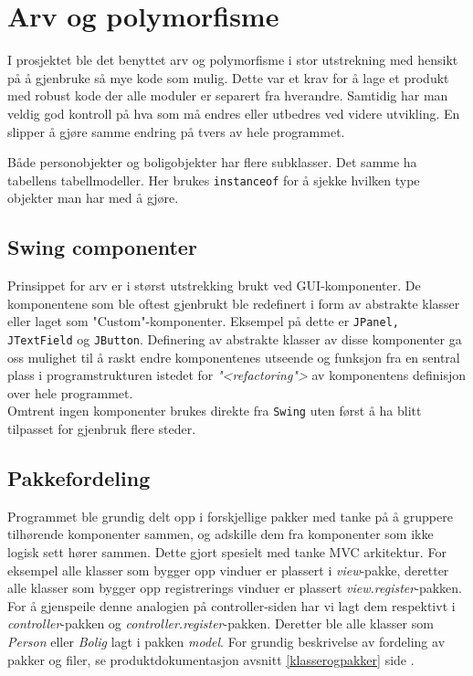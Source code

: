 \section{Arv og polymorfisme}
I prosjektet ble det benyttet arv og polymorfisme i stor utstrekning med hensikt på å gjenbruke så mye kode som mulig. Dette var et krav for å lage et produkt med robust kode der alle moduler er separert fra hverandre. Samtidig har man veldig god kontroll på hva som må endres eller utbedres ved videre utvikling. En slipper å gjøre samme endring på tvers av hele programmet.

Både personobjekter og boligobjekter har flere subklasser. Det samme ha tabellens tabellmodeller. Her brukes \texttt{instanceof} for å sjekke hvilken type objekter man har med å gjøre.

\subsection{Swing componenter}
Prinsippet for arv er i størst utstrekking brukt ved GUI-komponenter. De komponentene som ble oftest gjenbrukt ble redefinert i form av abstrakte klasser eller laget som "Custom"-komponenter. Eksempel på dette er \texttt{JPanel, JTextField} og \texttt{JButton}. Definering av abstrakte klasser av disse komponenter ga oss mulighet til å raskt endre komponentenes utseende og funksjon fra en sentral plass i programstrukturen istedet for \textit{"<refactoring">} av komponentens definisjon over hele programmet.\\  
Omtrent ingen komponenter brukes direkte fra \texttt{Swing} uten først å ha blitt tilpasset for gjenbruk flere steder.

\subsection{Pakkefordeling}
Programmet ble grundig delt opp i forskjellige pakker med tanke på å gruppere tilhørende komponenter sammen, og adskille dem fra komponenter som ikke logisk sett hører sammen. Dette gjort spesielt med tanke MVC arkitektur. For eksempel alle klasser som bygger opp vinduer er plassert i \emph{view}-pakke, deretter alle klasser som bygger opp registrerings vinduer er plassert \emph{view.register}-pakken. For å gjenspeile denne analogien på controller-siden har vi lagt dem respektivt i \emph{controller}-pakken og \emph{controller.register}-pakken. Deretter ble alle klasser som \emph{Person} eller \emph{Bolig} lagt i pakken \emph{model}. For grundig beskrivelse av fordeling av pakker og filer, se produktdokumentasjon avsnitt \ref{klasserogpakker} side \pageref{sec:klasserogpakker}.

